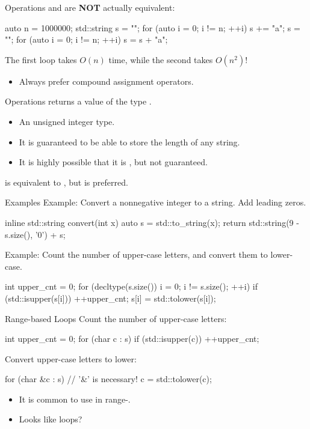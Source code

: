 \begin{frame}[fragile]{Operations}
     and  are \textbf{NOT} actually equivalent:
    \begin{cpp}
auto n = 1000000;
std::string s = "";
for (auto i = 0; i != n; ++i)
  s += "a";
s = "";
for (auto i = 0; i != n; ++i)
  s = s + "a";
    \end{cpp}
    The first loop takes \(O(n)\) time, while the second takes \(O\left(n^2\right)\)!
    \begin{itemize}
        \item Always prefer compound assignment operators.
    \end{itemize}
\end{frame}

\begin{frame}[fragile]{Operations}
     returns a value of the type .
    \begin{itemize}
        \item An unsigned integer type.
        \item It is guaranteed to be able to store the length of any string.
        \item It is highly possible that it is , but not guaranteed.
    \end{itemize}
    \pause
     is equivalent to , but  is preferred. 
\end{frame}

\begin{frame}[fragile]{Examples}
    Example: Convert a nonnegative integer to a string. Add leading zeros.
    \begin{cpp}
inline std::string convert(int x) {
  auto s = std::to_string(x);
  return std::string(9 - s.size(), '0') + s;
}
    \end{cpp}
    \pause
    Example: Count the number of upper-case letters, and convert them to lower-case.
    \begin{cpp}
int upper_cnt = 0;
for (decltype(s.size()) i = 0; i != s.size(); ++i)
  if (std::isupper(s[i])) {
    ++upper_cnt;
    s[i] = std::tolower(s[i]);
  }
    \end{cpp}
\end{frame}

\begin{frame}[fragile]{Range-based  Loops}
    Count the number of upper-case letters:
    \begin{cpp}
int upper_cnt = 0;
for (char c : s)
  if (std::isupper(c))
    ++upper_cnt;
    \end{cpp}
    \pause
    Convert upper-case letters to lower:
    \begin{cpp}
for (char &c : s)       // '&' is necessary!
  c = std::tolower(c);
    \end{cpp}
    \pause
    \begin{itemize}
        \item It is common to use  in range-.
        \item Looks like   loops?
    \end{itemize}
\end{frame}

